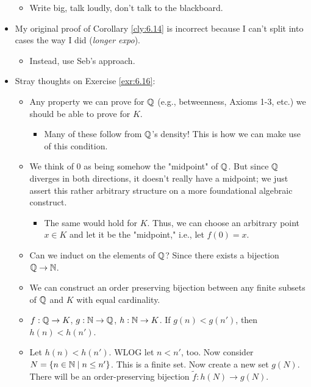 \documentclass{report}
\begin{document}
\begin{itemize}
\begin{itemize}
        \item Write big, talk loudly, don't talk to the blackboard.
    \end{itemize}
    \item My original proof of Corollary \ref{cly:6.14} is incorrect because I can't split into cases the way I did (\emph{longer expo}).
    \begin{itemize}
        \item Instead, use Seb's approach.
    \end{itemize}
    \item {}Stray thoughts on Exercise \ref{exr:6.16}:
    \begin{itemize}
        \item Any property we can prove for $\mathbb{Q}$ (e.g., betweenness, Axioms 1-3, etc.) we should be able to prove for $K$.
        \begin{itemize}
            \item Many of these follow from $\mathbb{Q}$'s density! This is how we can make use of this condition.
        \end{itemize}
        \item We think of 0 as being somehow the "midpoint" of $\mathbb{Q}$. But since $\mathbb{Q}$ diverges in both directions, it doesn't really have a midpoint; we just assert this rather arbitrary structure on a more foundational algebraic construct.
        \begin{itemize}
            \item The same would hold for $K$. Thus, we can choose an arbitrary point $x\in K$ and let it be the "midpoint," i.e., let $f(0)=x$.
        \end{itemize}
        \item Can we induct on the elements of $\mathbb{Q}$? Since there exists a bijection $\mathbb{Q}\to\mathbb{N}$.
        \item We can construct an order preserving bijection between any finite subsets of $\mathbb{Q}$ and $K$ with equal cardinality.
        \item $f:\mathbb{Q}\to K$, $g:\mathbb{N}\to\mathbb{Q}$, $h:\mathbb{N}\to K$. If $g(n)<g(n')$, then $h(n)<h(n')$.
        \item Let $h(n)<h(n')$. WLOG let $n<n'$, too. Now consider $N=\{n\in\mathbb{N}\mid n\leq n'\}$. This is a finite set. Now create a new set $g(N)$. There will be an order-preserving bijection $\tilde{f}:h(N)\to g(N)$.

\end{itemize}
\end{itemize}
\end{document}
